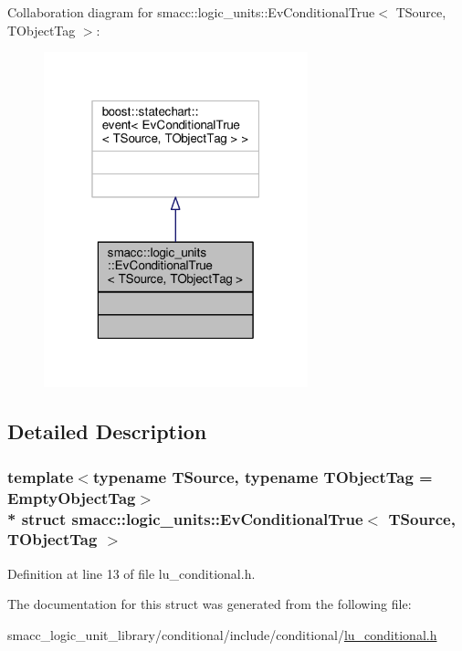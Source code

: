 Collaboration diagram for smacc\+:\+:logic\+\_\+units\+:\+:Ev\+Conditional\+True$<$ T\+Source, T\+Object\+Tag $>$\+:\nopagebreak
\begin{figure}[H]
\begin{center}
\leavevmode
\includegraphics[width=217pt]{structsmacc_1_1logic__units_1_1EvConditionalTrue__coll__graph}
\end{center}
\end{figure}


\subsection{Detailed Description}
\subsubsection*{template$<$typename T\+Source, typename T\+Object\+Tag = Empty\+Object\+Tag$>$\\*
struct smacc\+::logic\+\_\+units\+::\+Ev\+Conditional\+True$<$ T\+Source, T\+Object\+Tag $>$}



Definition at line 13 of file lu\+\_\+conditional.\+h.



The documentation for this struct was generated from the following file\+:\begin{DoxyCompactItemize}
\item 
smacc\+\_\+logic\+\_\+unit\+\_\+library/conditional/include/conditional/\hyperlink{lu__conditional_8h}{lu\+\_\+conditional.\+h}\end{DoxyCompactItemize}
